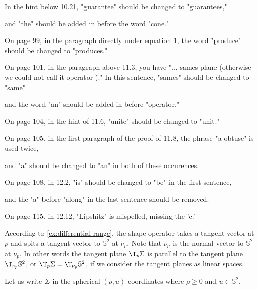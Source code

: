  In the hint below 10.21, "guarantee" should be changed to "guarantees," 
 
 and "the" should be added in before the word "cone." 
 
 On page 99, in the paragraph directly under equation 1,  the word "produce" should be changed to "produces." 
 
 On page 101, in the paragraph above 11.3, you have "... sames plane (otherwise we could not call it operator )." In this sentence, "sames" should be changed to "same" 
 
 and the word "an" should be added in before "operator." 
 
 On page 104, in the hint of 11.6, "unite" should be changed to "unit." 
 
 On page 105, in the first paragraph of the proof of 11.8, the phrase "a obtuse" is used twice, 
 
 and "a" should be changed to "an" in both of these occurences. 
 
 On page 108, in 12.2, "is" should be changed to "be" in the first sentence, 
 
 and the "a" before "along" in the last sentence should be removed. 
 
 On page 115, in 12.12, "Lipshitz" is mispelled, missing the 'c.'






















According to \ref{ex:differential-range}, the shape operator takes a tangent vector at $p$ and spits a tangent vector to $\mathbb{S}^2$ at $\nu_p$.
Note that $\nu_p$ is the normal vector to $\mathbb{S}^2$ at $\nu_p$.
In other words the tangent plane $\T_p\Sigma$ is parallel to the tangent plane $\T_{\nu_p}\mathbb{S}^2$,
or $\T_p\Sigma=\T_{\nu_p}\mathbb{S}^2$, if we consider the tangent planes as linear spaces. 












Let us write $\Sigma$ in the spherical $(\rho,u)$-coordinates where $\rho\ge 0$ and $u\in\mathbb{S}^2$.




